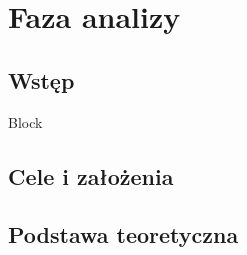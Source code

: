 \section{Faza analizy}
\subsection{Wstęp}

\indent Block

\clearpage

\subsection{Cele i założenia}

\subsection{Podstawa teoretyczna}

